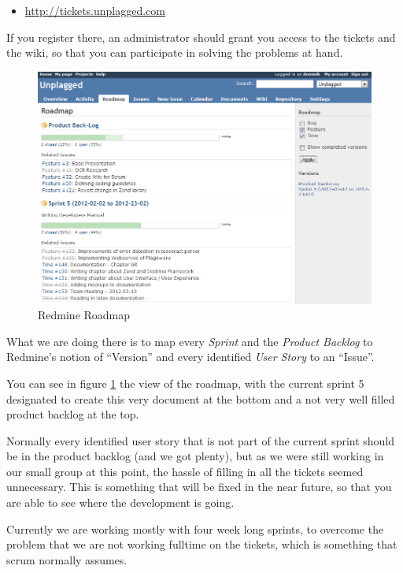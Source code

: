 \begin{itemize}
\item \url{http://tickets.unplagged.com}
\end{itemize}

If you register there, an administrator should grant you access to the tickets and the wiki, so that you can participate
in solving the problems at hand.

\begin{figure}[htbp]
  \centering
    \includegraphics[width=\textwidth]{images/roadmap.png}
  \caption{Redmine Roadmap}
  \label{fig:roadmap}
\end{figure}

What we are doing there is to map every \textit{Sprint} and the \textit{Product Backlog} to Redmine's notion of \enquote{Version} and
every identified \textit{User Story} to an \enquote{Issue}.

You can see in figure \ref{fig:roadmap} the view of the roadmap, with the current sprint 5 designated to create this very
document at the bottom and a not very well filled product backlog at the top. 

Normally 
every identified user story that is not part of the current sprint should be in the product backlog (and we got plenty), 
but as we were still working
in our small group at this point, the hassle of filling in all the tickets seemed unnecessary. This is something that
will be fixed in the near future, so that you are able to see where the development is going.

Currently we are working mostly with four week long sprints, to overcome the problem that we are not working fulltime
on the tickets, which is something that scrum normally assumes. 

